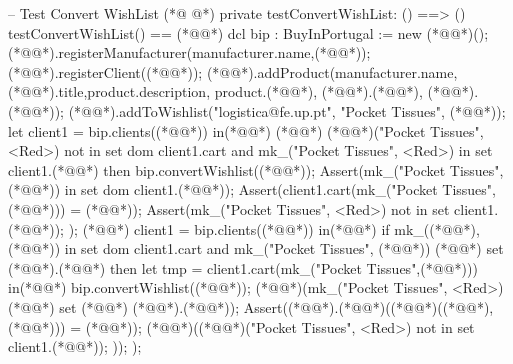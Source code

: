 \begin{vdmpp}[breaklines=true]
 -- Test Convert WishList
(*@
\label{testConvertWishList:304}
@*)
 private testConvertWishList: () ==> ()
 testConvertWishList() == (*@\vdmnotcovered{(}@*)
  dcl bip : BuyInPortugal := new (*@@*)();
  (*@@*).registerManufacturer(manufacturer.name,(*@@*));
  (*@@*).registerClient((*@@*));
  (*@@*).addProduct(manufacturer.name,(*@@*).title,product.description, product.(*@@*), (*@@*).(*@@*), (*@@*).(*@@*));
  (*@@*).addToWishlist("logistica@fe.up.pt", "Pocket Tissues", (*@@*));
  let client1 = bip.clients((*@@*))
  in(*@\vdmnotcovered{(}@*)
    (*@@*) (*@@*)("Pocket Tissues", <Red>) not in set dom client1.cart and mk_("Pocket Tissues", <Red>) in set client1.(*@@*) then
     bip.convertWishlist((*@@*));
     Assert(mk_("Pocket Tissues", (*@@*)) in set dom client1.(*@@*));
     Assert(client1.cart(mk_("Pocket Tissues",(*@@*))) = (*@@*));
     Assert(mk_("Pocket Tissues", <Red>) not in set client1.(*@@*));
  );
  (*@@*) client1 = bip.clients((*@@*))
  in(*@\vdmnotcovered{(}@*)
    if mk_((*@@*), (*@@*)) in set dom client1.cart and mk_("Pocket Tissues", (*@@*)) (*@@*) set (*@@*).(*@@*) then
     let tmp = client1.cart(mk_("Pocket Tissues",(*@@*)))
     in(*@\vdmnotcovered{(}@*)
     bip.convertWishlist((*@@*));
     (*@@*)(mk_("Pocket Tissues", <Red>) (*@@*) set (*@@*) (*@@*).(*@@*));
     Assert((*@@*).(*@@*)((*@@*)((*@@*),(*@@*))) = (*@@*));
     (*@@*)((*@@*)("Pocket Tissues", <Red>) not in set client1.(*@@*));
  ));
 );
 

\end{vdmpp}
